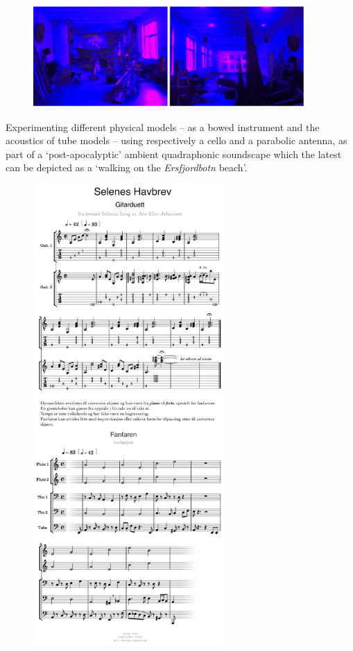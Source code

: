 \begin{enumerate}
\begin{figure}[H]
\hfill \includegraphics[width=0.92\textwidth]{mp/img/img5}
\end{figure}
Experimenting different physical models -- as a bowed instrument and the acoustics of tube models -- using respectively a cello and a parabolic antenna, as part of a `post-apocalyptic' ambient quadraphonic soundscape which the latest can be depicted as a  `walking on the \textit{Ersfjordbotn} beach'.
\end{enumerate}

\begin{figure}[htp]
	\begin{center}
		\includegraphics[width=0.65\textwidth]{mp/img/img6}
		\label{sh}
	\end{center}
\end{figure}

